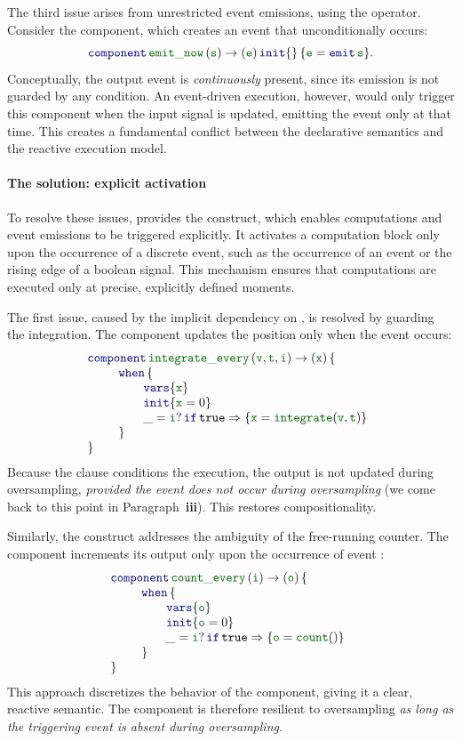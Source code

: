 The third issue arises from unrestricted event emissions, using the  operator. Consider
the  component, which creates an event that unconditionally occurs:
\begin{equation*}
    \component{\idf{emit\_now}}{\idf{s}}{\idf{e}}{\idf{e} = \emit{\idf{s}}}{}.
\end{equation*}
Conceptually, the output event  is \emph{continuously} present, since its emission is not
guarded by any condition. An event-driven execution, however, would only trigger this component when
the input signal  is updated, emitting the event only at that time. This creates a
fundamental conflict between the declarative semantics and the reactive execution model.

\paragraph{The solution: explicit activation}

To resolve these issues, \GRust provides the  construct, which enables computations and
event emissions to be triggered explicitly. It activates a computation block only upon the
occurrence of a discrete event, such as the occurrence of an event or the rising edge of a boolean
signal. This mechanism ensures that computations are executed only at precise, explicitly defined
moments.

The first issue, caused by the implicit dependency on \timeop, is resolved by guarding the
integration. The  component updates the position  only when the event
 occurs:
\begin{equation*}
    \componentTab{\idf{integrate\_every}}{\idf{v}, \idf{t}, \idf{i}}{\idf{x}}{
        \whenTab{\idf{x}}{\idf{x} = 0}{
            \branch{\detect{\_}{\idf{i}}}{\true}{\idf{x} = \idf{integrate}(\idf{v}, \idf{t})}
        }
    }
\end{equation*}
Because the  clause conditions the execution, the output  is not updated during
oversampling, \emph{provided the event  does not occur during oversampling} (we come back to
this point in Paragraph~\textbf{iii}). This restores compositionality.

Similarly, the  construct addresses the ambiguity of the free-running counter. The
 component increments its output only upon the occurrence of event :
\begin{equation*}
    \componentTab{\idf{count\_every}}{\idf{i}}{\idf{o}}{
        \whenTab{\idf{o}}{\idf{o} = 0}{
            \branch{\detect{\_}{\idf{i}}}{\true}{\idf{o} = \idf{count}()}
        }
    }
\end{equation*}
This approach discretizes the behavior of the  component, giving it a clear, reactive
semantic. The  component is therefore resilient to oversampling \emph{as long as
    the triggering event  is absent during oversampling}.

